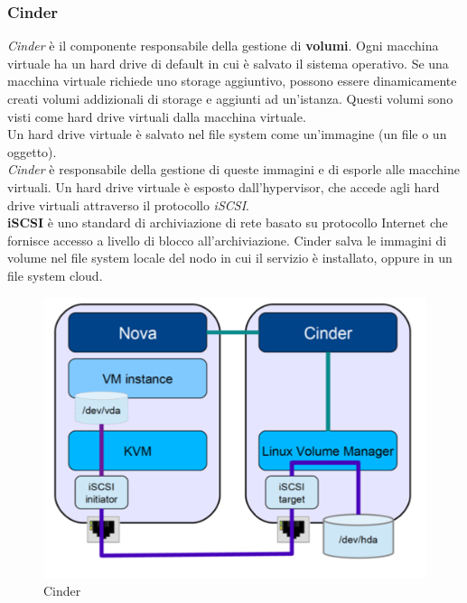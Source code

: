 \documentclass{article}
\begin{document}
\subsubsection{Cinder}
\textit{Cinder} è il componente responsabile della gestione di \textbf{volumi}. Ogni macchina virtuale ha un hard drive di default in cui è salvato il sistema operativo. Se una macchina virtuale richiede uno storage aggiuntivo, possono essere dinamicamente creati volumi addizionali di storage e aggiunti ad un'istanza. Questi volumi sono visti come hard drive virtuali dalla macchina virtuale. \\
Un hard drive virtuale è salvato nel file system come un'immagine (un file o un oggetto). \\
\textit{Cinder} è responsabile della gestione di queste immagini e di esporle alle macchine virtuali. Un hard drive virtuale è esposto dall'hypervisor, che accede agli hard drive virtuali attraverso il protocollo \textit{iSCSI}. \\
\textbf{iSCSI} è uno standard di archiviazione di rete basato su protocollo Internet che fornisce accesso a livello di blocco all'archiviazione. %
Cinder salva le immagini di volume nel file system locale del nodo in cui il servizio è installato, oppure in un file system cloud.
\begin{figure}[H]
    \centering
    \includegraphics[scale=0.4]{img/Cinder.png}
    \caption{Cinder}
\end{figure}\noindent
\end{document}
